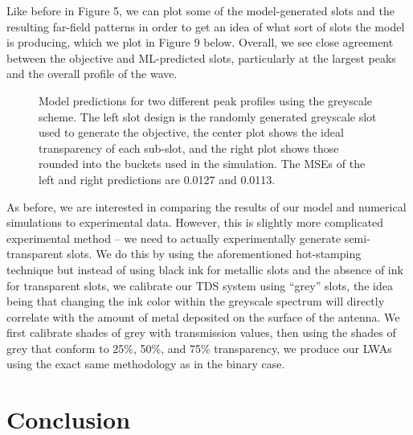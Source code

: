 \documentclass[11pt]{article}
\begin{document}
\noindent Like before in Figure 5, we can plot some of the model-generated slots and the resulting far-field patterns in order to get an idea of what sort of slots the model is producing, which we plot in Figure 9 below. Overall, we see close agreement between the objective and ML-predicted slots, particularly at the largest peaks and the overall profile of the wave.

\begin{figure}[H]
	\centering
	\caption{Model predictions for two different peak profiles using the greyscale scheme. The left slot design is the randomly generated greyscale slot used to generate the objective, the center plot shows the ideal transparency of each sub-slot, and the right plot shows those rounded into the buckets used in the simulation. The MSEs of the left and right predictions are 0.0127 and 0.0113.}
\end{figure}

\noindent As before, we are interested in comparing the results of our model and numerical simulations to experimental data. However, this is slightly more complicated experimental method -- we need to actually experimentally generate semi-transparent slots. We do this by using the aforementioned hot-stamping technique but instead of using black ink for metallic slots and the absence of ink for transparent slots, we calibrate our TDS system using ``grey'' slots, the idea being that changing the ink color within the greyscale spectrum will directly correlate with the amount of metal deposited on the surface of the antenna. We first calibrate shades of grey with transmission values, then using the shades of grey that conform to 25\%, 50\%, and 75\% transparency, we produce our LWAs using the exact same methodology as in the binary case.

\section*{Conclusion}



\end{document}
